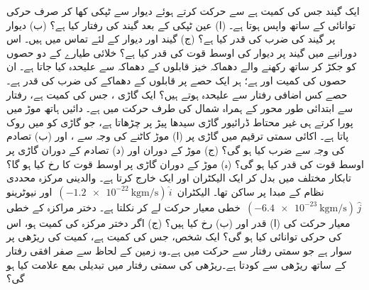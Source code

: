 ایک گیند جس کی کمیت  ہے  سے حرکت کرتے ہوئے  دیوار سے  ٹپکی کھا کر صرف  حرکی توانائی کے ساتھ واپس ہوتا ہے۔ (ا) عین   ٹپکی کے  بعد گیند کی رفتار کیا ہے؟ (ب)  دیوار پر گیند کی  ضرب کی قدر   کیا ہے؟ (ج)   گیند اور دیوار  کے لئے تماس میں ہیں۔ اس دورانیے میں  گیند پر دیوار کی   اوسط قوت  کی قدر  کیا ہے؟
خلائی طیارے کے دو حصوں  کو  جکڑ کر ساتھ رکھنے والے   دھماکہ خیز  قابلوں کے  دھماکہ  سے  علیحدہ کیا جاتا ہے۔ ان حصوں کی کمیت  اور  ہے؛ ہر   ایک  حصے پر قابلوں  کے دھماکے کی ضرب کی قدر  ہے۔ حصے کس اضافی رفتار سے علیحدہ ہوتے ہیں؟
ایک گاڑی ، جس کی کمیت  ہے،    رفتار سے ابتدائی  طور  محور  کے ہمراہ شمال کی طرف حرکت میں ہے۔ دائیں ہاتھ  موڑ  میں پورا کرتے ہی غیر محتاط ڈرائیور  گاڑی سیدھا  پیڑ  پر چڑھاتا ہے، جو گاڑی کو  میں روک پاتا ہے۔ اکائی   سمتی  ترقیم میں  گاڑی پر (ا) موڑ کاٹنے کی وجہ سے ، اور (ب)  تصادم کی وجہ سے ضرب کیا ہو گی؟ (ج) موڑ کے دوران اور (د) تصادم کے دوران گاڑی پر اوسط قوت کی قدر کیا ہو گی؟ (ہ) موڑ کے دوران گاڑی پر   اوسط  قوت کا رخ کیا ہو گا؟
تابکار       مختلف  
  میں  بدل کر ایک الیکٹران اور ایک  خارج کرتا ہے۔ والدینی مرکزہ  محددی نظام کے مبدا پر ساکن تھا۔ الیکٹران  
\(\,(\SI{-1.2e-22}{\kilo\gram\meter\per\second})\,\hat{i}\,\)
اور  نیوٹرینو  
\(\,(\SI{-6.4e-23}{\kilo\gram\meter\per\second})\,\hat{j}\,\)
 خطی معیار حرکت لے کر نکلتا ہے۔ دختر مراکزہ کے خطی معیار حرکت کی  (ا) قدر اور (ب) رخ کیا ہیں؟ (ج)  اگر دختر  مرکزہ کی کمیت  ہو، اس کی حرکی توانائی کیا ہو گی؟
ایک شخص، جس کی کمیت  ہے،    کمیت کی   ریڑھی پر  سوار ہے جو  سمتی رفتار سے  حرکت میں ہے۔وہ زمین کے لحاظ سے صفر افقی رفتار کے ساتھ  ریڑھی سے  کودتا ہے۔ریڑھی کی سمتی رفتار میں تبدیلی بمع علامت کیا ہو گی؟
